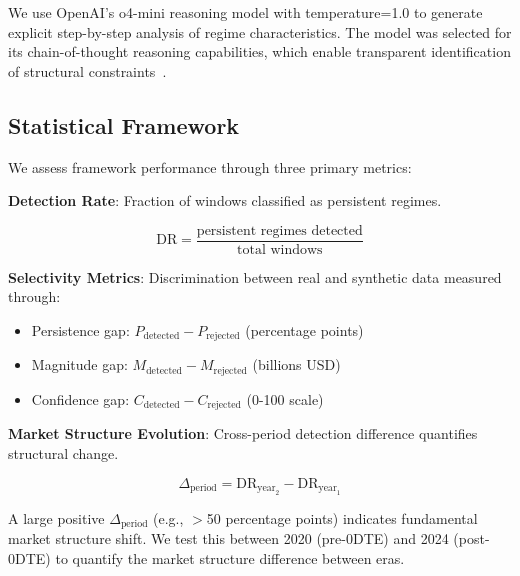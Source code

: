 We use OpenAI's o4-mini reasoning model with temperature=1.0 to generate explicit step-by-step analysis of regime characteristics. The model was selected for its chain-of-thought reasoning capabilities, which enable transparent identification of structural constraints~\citep{openai2024reasoning}.

\subsection{Statistical Framework}

We assess framework performance through three primary metrics:

\vspace{0.3cm}

\noindent\textbf{Detection Rate}: Fraction of windows classified as persistent regimes.

\begin{equation}
\text{DR} = \frac{\text{persistent regimes detected}}{\text{total windows}}
\end{equation}

\vspace{0.2cm}

\noindent\textbf{Selectivity Metrics}: Discrimination between real and synthetic data measured through:

\begin{itemize}
\item Persistence gap: $P_{\text{detected}} - P_{\text{rejected}}$ (percentage points)
\item Magnitude gap: $M_{\text{detected}} - M_{\text{rejected}}$ (billions USD)
\item Confidence gap: $C_{\text{detected}} - C_{\text{rejected}}$ (0-100 scale)
\end{itemize}

\vspace{0.2cm}

\noindent\textbf{Market Structure Evolution}: Cross-period detection difference quantifies structural change.

\begin{equation}
\Delta_{\text{period}} = \text{DR}_{\text{year}_2} - \text{DR}_{\text{year}_1}
\end{equation}

A large positive $\Delta_{\text{period}}$ (e.g., $>$50 percentage points) indicates fundamental market structure shift. We test this between 2020 (pre-0DTE) and 2024 (post-0DTE) to quantify the market structure difference between eras.
